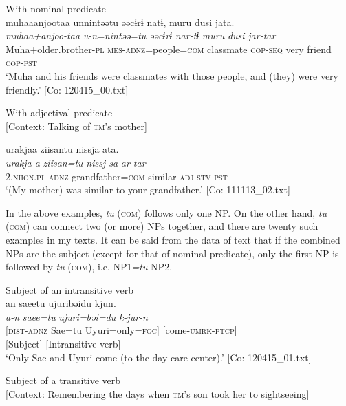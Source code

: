 \ex With nominal predicate\\
{\TM}
\glll  muhaaanjootaa  unnintəətu  əəcɨrɨ  natɨ,     muru  dusi  jata.\\
\textit{muhaa+anjoo-taa}  \textit{u-n=nintəə=tu}  \textit{əəcɨrɨ}  \textit{nar-tɨ}   \textit{muru}  \textit{dusi}  \textit{jar-tar}\\
Muha+older.brother-\textsc{pl}  \textsc{mes}-\textsc{adnz}=people=\textsc{com}  classmate  \textsc{cop}-\textsc{seq}   very  friend  \textsc{cop}-\textsc{pst}\\
\glt ‘Muha and his friends were classmates with those people, and (they) were very friendly.’ [Co: 120415\_00.txt]
\z

\ex With adjectival predicate\\{}
[Context: Talking of \textsc{tm}’s mother]

{\TM}
\glll urakjaa  ziisantu  nissja  ata.\\
      \textit{urakja-a}  \textit{ziisan=tu}  \textit{nissj-sa}  \textit{ar-tar}\\
      2.\textsc{nhon}.\textsc{pl}-\textsc{adnz}  grandfather=\textsc{com}  similar-\textsc{adj}  \textsc{stv}-\textsc{pst}\\
\glt ‘(My mother) was similar to your grandfather.’ [Co: 111113\_02.txt]
\z

In the above examples, \textit{tu} (\textsc{com}) follows only one NP. On the other hand, \textit{tu} (\textsc{com}) can connect two (or more) NPs together, and there are twenty such examples in my texts. It can be said from the data of text that if the combined NPs are the subject (except for that of nominal predicate), only the first NP is followed by \textit{tu} (\textsc{com}), i.e. NP1\textit{=tu} NP2.

\ea\label{ex:6-74}
\ea Subject of an intransitive verb\\
{\TM}
\gllll  an  saeetu  ujuribəidu  kjun.\\
\textit{a-n}  \textit{saee=tu}  \textit{ujuri=bəi=du}  \textit{k-jur-n}\\
{}[\textsc{dist}-\textsc{adnz}  Sae=tu  Uyuri=only=\textsc{foc}]  [come-\textsc{umrk}-\textsc{ptcp}]\\
      {}[Subject]  [Intransitive verb]\\
\glt ‘Only Sae and Uyuri come (to the day-care center).’ [Co: 120415\_01.txt]
\z

\ex Subject of a transitive verb\\{}
[Context: Remembering the days when \textsc{tm}’s son took her to sightseeing]

